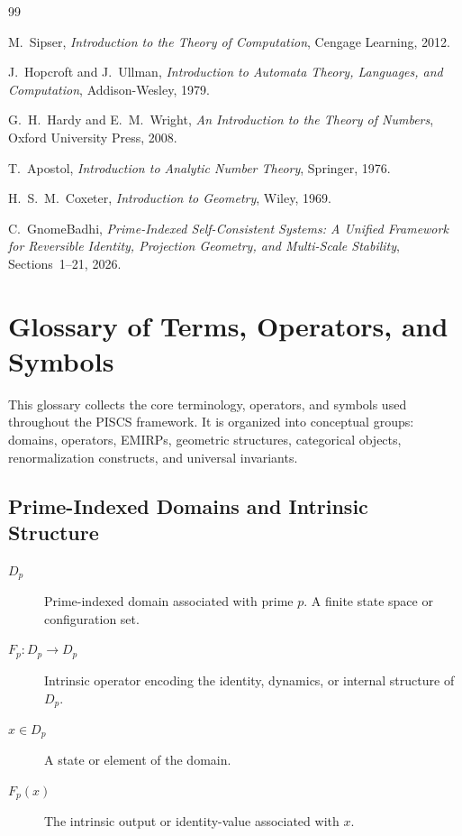 \documentclass[11pt]{article}
\theoremstyle{definition}
\theoremstyle{plain}
\theoremstyle{remark}
\begin{document}
\begin{thebibliography}{99}

M.~Sipser,
\newblock \emph{Introduction to the Theory of Computation},
\newblock Cengage Learning, 2012.

J.~Hopcroft and J.~Ullman,
\newblock \emph{Introduction to Automata Theory, Languages, and Computation},
\newblock Addison-Wesley, 1979.


G.~H.~Hardy and E.~M.~Wright,
\newblock \emph{An Introduction to the Theory of Numbers},
\newblock Oxford University Press, 2008.

T.~Apostol,
\newblock \emph{Introduction to Analytic Number Theory},
\newblock Springer, 1976.


H.~S.~M.~Coxeter,
\newblock \emph{Introduction to Geometry},
\newblock Wiley, 1969.


C.~GnomeBadhi,
\newblock \emph{Prime-Indexed Self-Consistent Systems: A Unified Framework for
Reversible Identity, Projection Geometry, and Multi-Scale Stability},
\newblock Sections~1--21, 2026.

\end{thebibliography}

\section*{Glossary of Terms, Operators, and Symbols}

This glossary collects the core terminology, operators, and symbols used
throughout the PISCS framework. It is organized into conceptual groups:
domains, operators, EMIRPs, geometric structures, categorical objects,
renormalization constructs, and universal invariants.

\subsection*{Prime-Indexed Domains and Intrinsic Structure}

\begin{description}

\item[$D_p$] Prime-indexed domain associated with prime $p$. A finite
state space or configuration set.

\item[$F_p : D_p \to D_p$] Intrinsic operator encoding the identity,
dynamics, or internal structure of $D_p$.

\item[$x \in D_p$] A state or element of the domain.

\item[$F_p(x)$] The intrinsic output or identity-value associated with
$x$.

\end{description}
\end{document}

